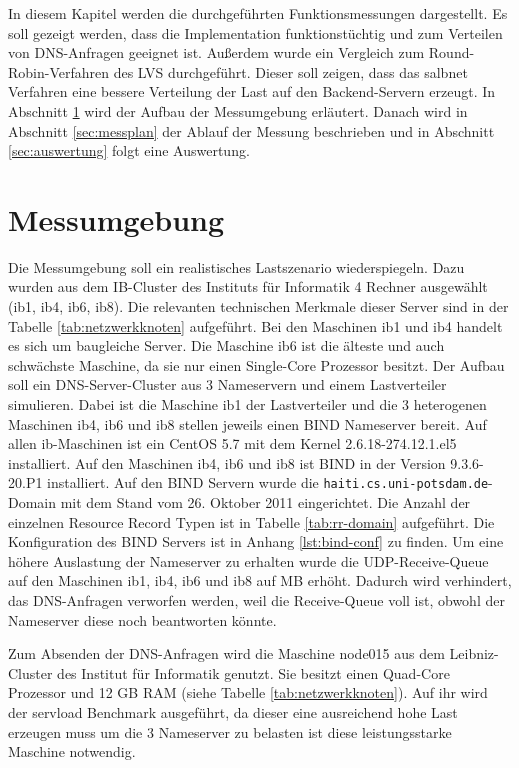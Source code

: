 \documentclass[a4paper, 12pt, BCOR10mm, DIV12, toc=bibliography, toc=listof, german]{scrbook}
\begin{document}
		In diesem Kapitel werden die durchgeführten Funktionsmessungen dargestellt. Es soll gezeigt
		werden, dass die Implementation funktionstüchtig und zum Verteilen von DNS-Anfragen geeignet
		ist. Außerdem wurde ein Vergleich zum Round-Robin-Verfahren des LVS durchgeführt. Dieser soll
		zeigen, dass das salbnet Verfahren eine bessere Verteilung der Last auf den Backend-Servern
		erzeugt. In Abschnitt \ref{sec:messumgebung} wird der Aufbau der Messumgebung erläutert. Danach
		wird in Abschnitt \ref{sec:messplan} der Ablauf der Messung beschrieben und in Abschnitt
		\ref{sec:auswertung} folgt eine Auswertung.

		\section{Messumgebung} %
		\label{sec:messumgebung}

		Die Messumgebung soll ein realistisches Lastszenario wiederspiegeln. Dazu wurden aus dem
		IB-Cluster des Instituts für Informatik 4 Rechner ausgewählt (ib1, ib4, ib6, ib8). Die
		relevanten technischen Merkmale dieser Server sind in der Tabelle \ref{tab:netzwerkknoten}
		aufgeführt. Bei den	Maschinen ib1 und ib4 handelt es sich um baugleiche Server. Die Maschine ib6
		ist die älteste und auch schwächste Maschine, da sie nur einen Single-Core Prozessor besitzt.
		Der Aufbau soll ein DNS-Server-Cluster aus 3 Nameservern und einem Lastverteiler simulieren.
		Dabei ist die Maschine ib1 der Lastverteiler und die 3 heterogenen Maschinen ib4, ib6 und ib8
		stellen jeweils einen BIND Nameserver bereit.	Auf allen ib-Maschinen ist ein CentOS 5.7 mit dem
		Kernel 2.6.18-274.12.1.el5 installiert.  Auf den Maschinen ib4, ib6 und ib8 ist BIND in der
		Version 9.3.6-20.P1 installiert. Auf den BIND Servern wurde die
		\texttt{haiti.cs.uni-potsdam.de}-Domain mit dem Stand vom 26. Oktober 2011 eingerichtet. Die
		Anzahl der einzelnen Resource Record Typen ist in Tabelle \ref{tab:rr-domain} aufgeführt. Die
		Konfiguration des BIND Servers ist in Anhang \ref{lst:bind-conf} zu finden. Um eine höhere
		Auslastung der Nameserver zu erhalten wurde die UDP-Receive-Queue auf den Maschinen ib1, ib4,
		ib6 und ib8 auf \unit[24]{MB} erhöht. Dadurch wird verhindert, das DNS-Anfragen verworfen
		werden, weil die Receive-Queue voll ist, obwohl der Nameserver diese noch beantworten könnte.
		
		Zum Absenden der DNS-Anfragen wird die Maschine node015 aus dem Leibniz-Cluster des Institut für
		Informatik genutzt. Sie besitzt einen Quad-Core Prozessor und 12 GB RAM (siehe Tabelle
		\ref{tab:netzwerkknoten}). Auf ihr wird der servload Benchmark ausgeführt, da dieser eine
		ausreichend hohe Last erzeugen muss um die 3 Nameserver zu belasten ist diese leistungsstarke
		Maschine notwendig.
\end{document}
